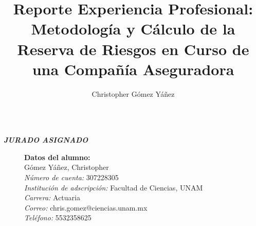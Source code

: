 \documentclass[11pt,twoside,openright,spanish]{report}
\numberwithin{equation}{chapter}
\numberwithin{figure}{chapter}
\numberwithin{table}{chapter}
\renewcommand{\baselinestretch}{1.5}
\newenvironment{changemargin}[3]{
	\begin{list}{}{
			\setlength{\topsep}{#3}
			\setlength{\leftmargin}{#1}
			\setlength{\rightmargin}{#2}
			\setlength{\listparindent}{\parindent}
			\setlength{\itemindent}{\parindent}
			\setlength{\parsep}{\parskip}
		}
		\item[]}{\end{list}}
\begin{document}
	
	\renewcommand{\baselinestretch}{1}
	
	\graphicspath{{./Imagenes/}}
	
	\title{Reporte Experiencia Profesional: Metodología y Cálculo de la Reserva de Riesgos en Curso de una Compañía Aseguradora}
	\author{Christopher Gómez Yáñez}
	\maketitle
	
	\newpage
	$\ $
	\thispagestyle{empty} %
	
	\begin{changemargin}{1cm}{0cm}{1cm}
		
		\vspace{30cm} 
		\begin{center}
			\textit{\textbf{\Large JURADO ASIGNADO}}
		\end{center}
		\vspace{1cm}
		\doublespacing
		\begin{description}
			\item[]\textbf{Datos del alumno:}\\
			Gómez Yáñez, Christopher\\
			\textit{Número de cuenta:} 307228305\\
			\textit{Institución de adscripción:} Facultad de Ciencias, UNAM\\
			\textit{Carrera:} Actuaria\\
			\textit{Correo:} chris.gomez@ciencias.unam.mx\\
			\textit{Teléfono:} 5532358625
			\vspace{1cm}
			

\end{description}
\end{changemargin}
\end{document}
